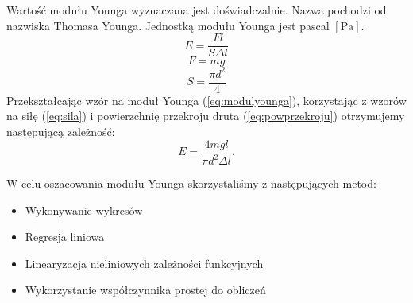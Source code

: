 \documentclass [a4paper,11pt]{article}
\begin{document}
	Wartość modułu Younga wyznaczana jest doświadczalnie. Nazwa pochodzi od nazwiska Thomasa Younga. Jednostką modułu Younga jest pascal $\left[ \text{Pa} \right]$.
	\begin{equation}
	\label{eq:modulyounga}
		E = \frac{F l}{S \Delta l}
	\end{equation}
	\begin{equation}
	\label{eq:sila}
	F = mg
	\end{equation}
	\begin{equation}
	\label{eq:powprzekroju}
	S = \frac{ \pi d^2 }{4}
	\end{equation}
	Przekształcając wzór na moduł Younga (\ref{eq:modulyounga}), korzystając z wzorów na siłę (\ref{eq:sila}) i powierzchnię przekroju druta (\ref{eq:powprzekroju}) otrzymujemy następującą zależność:
	\begin{equation}
		\label{eq:wzorroboczy}
		E = \frac{4mgl}{\pi d^2 \Delta l} \text{.}
	\end{equation}
	
	\vspace{1em}
	\noindent
	W celu oszacowania modułu Younga skorzystaliśmy z następujących metod:
	\begin{itemize}
		\item Wykonywanie wykresów	
		\item Regresja liniowa
		\item Linearyzacja nieliniowych zależności funkcyjnych
		\item Wykorzystanie współczynnika prostej do obliczeń
	\end{itemize}
	
\end{document}
